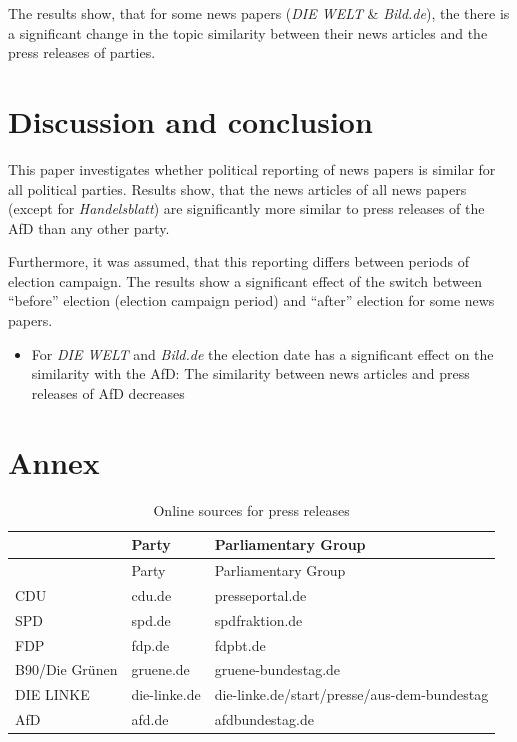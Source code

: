 \documentclass[
]{article}
\providecommand{\tightlist}{%
  \setlength{\itemsep}{0pt}\setlength{\parskip}{0pt}}
\begin{document}
The results show, that for some news papers (\emph{DIE WELT} \&
\emph{Bild.de}), the there is a significant change in the topic
similarity between their news articles and the press releases of
parties.

\hypertarget{discussion-and-conclusion}{%
\section{Discussion and conclusion}\label{discussion-and-conclusion}}

This paper investigates whether political reporting of news papers is
similar for all political parties. Results show, that the news articles
of all news papers (except for \emph{Handelsblatt}) are significantly
more similar to press releases of the AfD than any other party.

Furthermore, it was assumed, that this reporting differs between periods
of election campaign. The results show a significant effect of the
switch between ``before'' election (election campaign period) and
``after'' election for some news papers.

\begin{itemize}
\tightlist
\item
  For \emph{DIE WELT} and \emph{Bild.de} the election date has a
  significant effect on the similarity with the AfD: The similarity
  between news articles and press releases of AfD decreases
\end{itemize}

\newpage

\hypertarget{annex}{%
\section{Annex}\label{annex}}

\begin{longtable}[]{@{}lll@{}}
\caption{Online sources for press releases
\label{table:press_releases_sources}}\tabularnewline
\toprule
& Party & Parliamentary Group\tabularnewline
\midrule
\endfirsthead
\toprule
& Party & Parliamentary Group\tabularnewline
\midrule
\endhead
CDU & cdu.de & presseportal.de\tabularnewline
SPD & spd.de & spdfraktion.de\tabularnewline
FDP & fdp.de & fdpbt.de\tabularnewline
B90/Die Grünen & gruene.de & gruene-bundestag.de\tabularnewline
DIE LINKE & die-linke.de &
die-linke.de/start/presse/aus-dem-bundestag\tabularnewline
AfD & afd.de & afdbundestag.de\tabularnewline
\bottomrule
\end{longtable}
\end{document}
